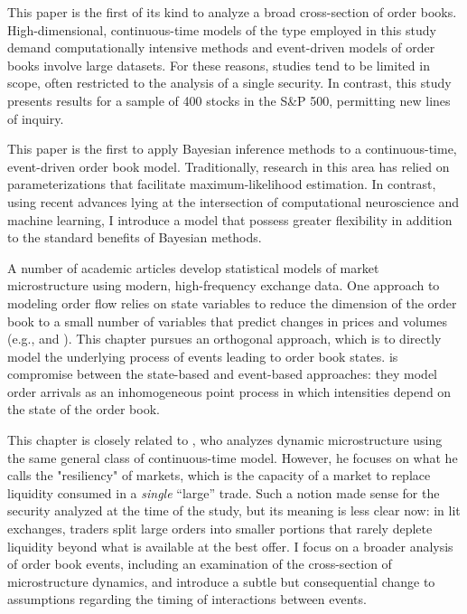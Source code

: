 	This paper is the first of its kind to analyze a broad cross-section of order books. High-dimensional, continuous-time models of the type employed in this study demand computationally intensive methods and event-driven models of order books involve large datasets. For these reasons, studies tend to be limited in scope, often restricted to the analysis of a single security. In contrast, this study presents results for a sample of 400 stocks in the S\&P 500, permitting new lines of inquiry.

	This paper is the first to apply Bayesian inference methods to a continuous-time, event-driven order book model. Traditionally, research in this area has relied on parameterizations that facilitate maximum-likelihood estimation. In contrast, using recent advances lying at the intersection of computational neuroscience and machine learning, I introduce a model that possess greater flexibility in addition to the standard benefits of Bayesian methods.

	A number of academic articles develop statistical models of market microstructure using modern, high-frequency exchange data. One approach to modeling order flow relies on state variables to reduce the dimension of the order book to a small number of variables that predict changes in prices and volumes (e.g., \cite{Avellaneda2011} and \cite{Cont2013B}). This chapter pursues an orthogonal approach, which is to directly model the underlying process of events leading to order book states. \cite{Huang2015} is compromise between the state-based and event-based approaches: they model order arrivals as an inhomogeneous point process in which intensities depend on the state of the order book.

	This chapter is closely related to \cite{Large2007}, who analyzes dynamic microstructure using the same general class of continuous-time model. However, he focuses on what he calls the "resiliency" of markets, which is the capacity of a market to replace liquidity consumed in a \textit{single} ``large'' trade. Such a notion made sense for the security analyzed at the time of the study, but its meaning is less clear now: in lit exchanges, traders split large orders into smaller portions that rarely deplete liquidity beyond what is available at the best offer. I focus on a broader analysis of order book events, including an examination of the cross-section of microstructure dynamics, and introduce a subtle but consequential change to assumptions regarding the timing of interactions between events.

